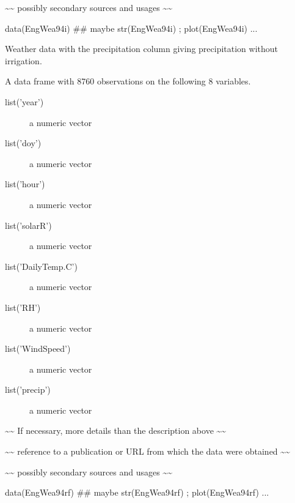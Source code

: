 \documentclass[letterpaper]{book}
\begin{document}
%
\begin{References}\relax
\textasciitilde{}\textasciitilde{} possibly secondary sources and usages \textasciitilde{}\textasciitilde{}
\end{References}
%
\begin{Examples}
\begin{ExampleCode}
data(EngWea94i)
## maybe str(EngWea94i) ; plot(EngWea94i) ...
\end{ExampleCode}
\end{Examples}
%
\begin{Description}\relax
Weather data with the precipitation column giving
precipitation without irrigation.
\end{Description}
%
\begin{Format}
A data frame with 8760 observations on the following 8 variables.
\begin{description}
 \item[list('year')] a numeric vector\item[list('doy')] a
numeric vector\item[list('hour')] a numeric vector
\item[list('solarR')] a numeric vector\item[list('DailyTemp.C')] a
numeric vector\item[list('RH')] a numeric vector
\item[list('WindSpeed')] a numeric vector\item[list('precip')] a numeric
vector
\end{description}
\end{Format}
%
\begin{Details}\relax
\textasciitilde{}\textasciitilde{} If necessary, more details than the description above
\textasciitilde{}\textasciitilde{}
\end{Details}
%
\begin{Source}\relax
\textasciitilde{}\textasciitilde{} reference to a publication or URL from which the data
were obtained \textasciitilde{}\textasciitilde{}
\end{Source}
%
\begin{References}\relax
\textasciitilde{}\textasciitilde{} possibly secondary sources and usages \textasciitilde{}\textasciitilde{}
\end{References}
%
\begin{Examples}
\begin{ExampleCode}
data(EngWea94rf)
## maybe str(EngWea94rf) ; plot(EngWea94rf) ...
\end{ExampleCode}
\end{Examples}
\end{document}

